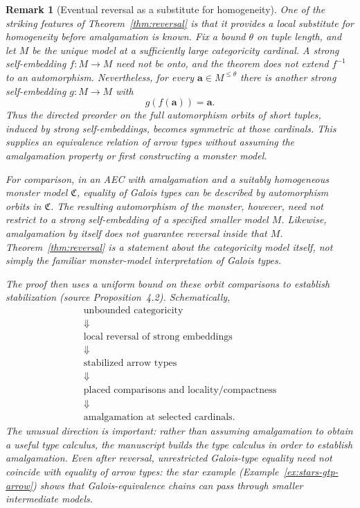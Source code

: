 \documentclass[11pt]{article}
\newcommand{\ba}{\mathbf{a}}
\theoremstyle{plain}
\newtheorem{remark}[definition]{Remark}
\begin{document}
\begin{remark}[Eventual reversal as a substitute for homogeneity]
\label{rem:reversal-homogeneity}
One of the striking features of Theorem~\ref{thm:reversal}
is that it provides a \emph{local substitute for homogeneity
before amalgamation is known}. Fix a bound $\theta$ on tuple
length, and let $M$ be the unique model at a sufficiently
large categoricity cardinal. A strong self-embedding
$f:M\longrightarrow M$ need not be onto, and the theorem
does not extend $f^{-1}$ to an automorphism. Nevertheless,
for every $\ba\in M^{\leq\theta}$ there is another strong
self-embedding $g:M\longrightarrow M$ with
\[
g(f(\ba))=\ba.
\]
Thus the directed preorder on the \emph{full automorphism
orbits} of short tuples, induced by strong self-embeddings,
becomes symmetric at those cardinals. This supplies
an equivalence relation of arrow types without assuming
the amalgamation property or first constructing a
monster model.

For comparison, in an AEC with amalgamation and a suitably
homogeneous monster model $\mathfrak C$, equality of Galois
types can be described by automorphism orbits in
$\mathfrak C$. The resulting automorphism of the
\emph{monster}, however, need not restrict to a strong
self-embedding of a specified smaller model $M$.
Likewise, amalgamation by itself does not guarantee
reversal inside that $M$. Theorem~\ref{thm:reversal}
is a statement about the categoricity model itself,
not simply the familiar monster-model interpretation
of Galois types.

The proof then uses a uniform bound on these orbit
comparisons to establish stabilization
(source Proposition~4.2). Schematically,
\[
\begin{gathered}
\text{unbounded categoricity}\\
\Downarrow\\
\text{local reversal of strong embeddings}\\
\Downarrow\\
\text{stabilized arrow types}\\
\Downarrow\\
\text{placed comparisons and locality/compactness}\\
\Downarrow\\
\text{amalgamation at selected cardinals}.
\end{gathered}
\]
The unusual direction is important: rather than
assuming amalgamation to obtain a useful type
calculus, the manuscript builds the type calculus
\emph{in order to establish amalgamation}. Even
after reversal, unrestricted Galois-type equality
need not coincide with equality of arrow types:
the star example (Example~\ref{ex:stars-gtp-arrow})
shows that Galois-equivalence chains can pass through
smaller intermediate models.


\end{remark}
\end{document}
